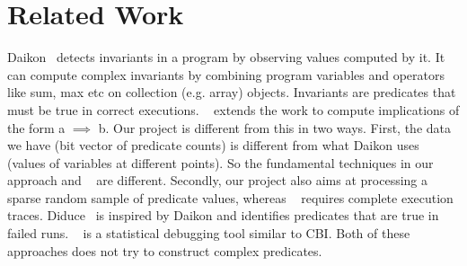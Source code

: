 \section{Related Work}
\label{sec-rw}
Daikon~\cite{ErnstPGMPTX2006} detects invariants in a program by observing values computed by it.  It can compute complex invariants by combining program variables and operators like sum, max etc on collection (e.g. array) objects.  Invariants are predicates that must be true in correct executions.  ~\cite{ErnstDRAFT} extends the work to compute implications of the form a $\implies$ b.  Our project is different from this in two ways.  First, the data we have (bit vector of predicate counts) is different from what Daikon uses (values of variables at different points).  So the fundamental techniques in our approach and ~\cite{ErnstDRAFT} are different.  Secondly, our project also aims at processing a sparse random sample of predicate values, whereas ~\cite{ErnstPGMPTX2006} requires complete execution traces.  Diduce~\cite{581377} is inspired by Daikon and identifies predicates that are true in failed runs.  ~\cite{1081753} is a statistical debugging tool similar to CBI.  Both of these approaches does not try to construct complex predicates.